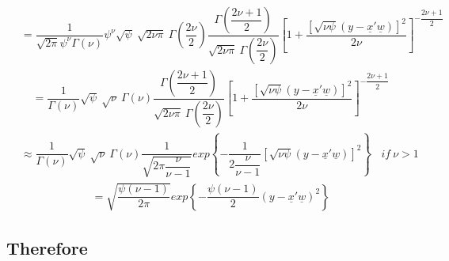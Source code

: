 \documentclass[fleqn]{minimal}
\begin{document}
\begin{align*}
  \ \ \ \
  = \dfrac{1}{\sqrt{2\pi}\psi^\nu \Gamma(\nu)}
  \psi^\nu\sqrt{\psi} \
  \sqrt{2\nu\pi} \ \Gamma\left(\dfrac{2\nu}{2}\right)
  \dfrac
  {
    \Gamma\left(\dfrac{2\nu+1}{2}\right)
  }
  {
    \sqrt{2\nu\pi} \ \Gamma\left(\dfrac{2\nu}{2}\right)
  }
  \left[
    1+
    \dfrac
    {
      \left[\sqrt{\nu\psi}\left( y - \underline{x}'\underline{w}\right) \right]^2
    }
    {
      2\nu
    }
  \right]^{-\dfrac{2\nu+1}{2}}
\end{align*}
\begin{align*}
  \ \ \ \
  = \dfrac{1}{\Gamma(\nu)}
  \sqrt{\psi} \
  \sqrt{\nu} \ \Gamma\left(\nu\right)
  \dfrac
  {
    \Gamma\left(\dfrac{2\nu+1}{2}\right)
  }
  {
    \sqrt{2\nu\pi} \ \Gamma\left(\dfrac{2\nu}{2}\right)
  }
  \left[
    1+
    \dfrac
    {
      \left[\sqrt{\nu\psi}\left( y - \underline{x}'\underline{w}\right) \right]^2
    }
    {
      2\nu
    }
  \right]^{-\dfrac{2\nu+1}{2}}
\end{align*}
\begin{align*}
  \ \ \ \
  \approx
  \dfrac{1}{\Gamma(\nu)}
  \sqrt{\psi} \
  \sqrt{\nu} \ \Gamma\left(\nu\right)
  \dfrac{1}{\sqrt{2\pi\dfrac{\nu}{\nu-1}}}
  exp
  \left\{
    -\dfrac{1}{2\dfrac{\nu}{\nu-1}}
  \left[\sqrt{\nu\psi}\left( y - \underline{x}'\underline{w}\right) \right]^2
  \right\}
  \ \ \ \
  if \ \nu > 1
\end{align*}
\begin{align*}
  \ \ \ \
  =
  \sqrt{\dfrac{\psi\left(\nu-1\right)}{2\pi}}
  exp
  \left\{
    -\dfrac{\psi\left(\nu-1\right)}{2}
    \left( y - \underline{x}'\underline{w}\right)^2
  \right\}
\end{align*}

\subsection{Therefore}
\end{document}
